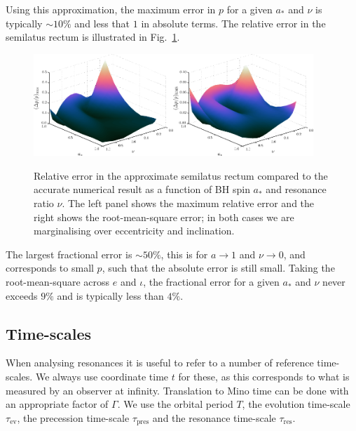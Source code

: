 \documentclass[aps,prd,amsfonts,amssymb,amsmath,nofootinbib,reprint,showpacs]{revtex4}
\newcommand{\figref}[1]{Fig.\ \ref{fig:#1}}
\newcommand{\sub}[1]{\ensuremath{_\text{#1}}}
\begin{document}
Using this approximation, the maximum error in $p$ for a given $a_\ast$ and $\nu$ is typically $\sim10\%$ and less that $1$ in absolute terms. The relative error in the semilatus rectum is illustrated in \figref{p-error}. 
\begin{figure}[htp]
\centering
\centerline{\includegraphics[width=0.47\textwidth]{Fig_fit-error-max-plane}\quad\includegraphics[width=0.47\textwidth]{Fig_fit-error-RMS-plane}}
\caption{\label{fig:p-error}Relative error in the approximate semilatus rectum compared to the accurate numerical result as a function of BH spin $a_\ast$ and resonance ratio $\nu$. The left panel shows the maximum relative error and the right shows the root-mean-square error; in both cases we are marginalising over eccentricity and inclination.}
\end{figure}
The largest fractional error is $\sim50\%$, this is for $a\rightarrow 1$ and $\nu \rightarrow 0$, and corresponds to small $p$, such that the absolute error is still small. Taking the root-mean-square across $e$ and $\iota$, the fractional error for a given $a_\ast$ and $\nu$ never exceeds $9\%$ and is typically less than $4\%$.

\subsection{Time-scales}\label{sec:res-time}

When analysing resonances it is useful to refer to a number of reference time-scales.  We always use coordinate time $t$ for these, as this corresponds to what is measured by an observer at infinity. Translation to Mino time can be done with an appropriate factor of $\Gamma$. We use the orbital period $T$, the evolution time-scale $\tau\sub{ev}$, the precession time-scale $\tau\sub{pres}$ and the resonance time-scale $\tau\sub{res}$.
\end{document}
